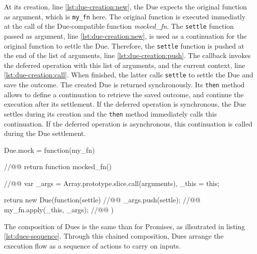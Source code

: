 At its creation, line \ref{lst:due-creation:new}, the Due expects the original function as argument, which is \texttt{my\_fn} here.
The original function is executed immediatly at the call of the Due-compatible function \textit{mocked\_fn}.
The \texttt{settle} function passed as argument, line \ref{lst:due-creation:new}, is used as a continuation for the original function to settle the Due. %
Therefore, the \texttt{settle} function is pushed at the end of the list of arguments, line \ref{lst:due-creation:push}.
The callback invokes the deferred operation with this list of arguments, and the current context, line \ref{lst:due-creation:call}.
When finished, the latter calls \texttt{settle} to settle the Due and save the outcome.
The created Due is returned synchronously.
Its \texttt{then} method allows to define a continuation to retrieve the saved outcome, and continue the execution after its settlement.
If the deferred operation is synchronous, the Due settles during its creation and the \texttt{then} method immediately calls this continuation.
If the deferred operation is asynchronous, this continuation is called during the Due settlement.


\begin{code}[js, %
             caption={Creation of a due}, %
             label={lst:due-creation}] %
Due.mock = function(my_fn) { //@\label{lst:due-creation:mock}@
  return function mocked_fn() { //@\label{lst:due-creation:mocked}@
    var _args = Array.prototype.slice.call(arguments),
        _this = this;

    return new Due(function(settle) {  //@\label{lst:due-creation:new}@
      _args.push(settle);  //@\label{lst:due-creation:push}@
      my_fn.apply(_this, _args); //@\label{lst:due-creation:call}@
    })
  }
}
\end{code}

The composition of Dues is the same than for Promises, as illsutrated in listing \ref{lst:dues-sequence}.%
Through this chained composition, Dues arrange the execution flow as a sequence of actions to carry on inputs.

